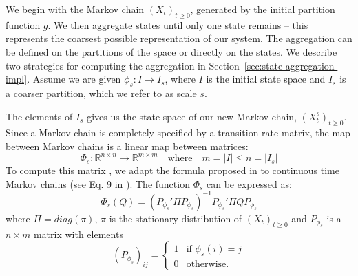 We begin with the Markov chain $(X_t)_{t \ge 0}$, generated by the initial partition function $g$. We then aggregate states until only one state remains -- this represents the coarsest possible representation of our system. The aggregation can be defined on the partitions of the space or directly on the states. We describe two strategies for computing the aggregation in Section~\ref{sec:state-aggregation-impl}. Assume we are given $\phi_s: I\rightarrow I_s$, where $I$ is the initial state space and $I_s$ is a coarser partition, which we refer to as scale $s$. 

The elements of $I_s$ gives us the state space of our new Markov chain, $(X_t^{s})_{t \ge 0}$. Since a Markov chain is completely specified by a transition rate matrix, the map between Markov chains is a linear map between matrices: 
$$\Phi_s: \mathbb{R}^{n \times n} \rightarrow \mathbb{R}^{m \times m} \quad \mbox{where} \quad m = |I| \leq n =|I_s|$$
To compute this matrix , we adapt the formula proposed in \cite{5746509} to continuous time Markov chains (see Eq. 9 in \cite{5746509}). The function $\Phi_s$ can be expressed as:
\begin{equation}
	\label{eq:ctmc-state-aggregation}
	\Phi_s(Q) = (P_{\phi_s}' \Pi P_{\phi_s})^{-1} P_{\phi_s}' \Pi Q P_{\phi_s}
\end{equation}
where $\Pi = diag(\pi)$, $\pi$ is the stationary distribution of $(X_t)_{t \ge 0}$ and $P_{\phi_s}$ is a 
$n \times m$ matrix with elements
\begin{equation}
	\nonumber
	\left(P_{\phi_s}\right)_{ij} = 
		\left\{
			\begin{array}{ll}
				1 & \mbox{if } \phi_s(i) = j \\
				0 & \mbox{otherwise}.
			\end{array}
		\right.
\end{equation}
%
%
%
